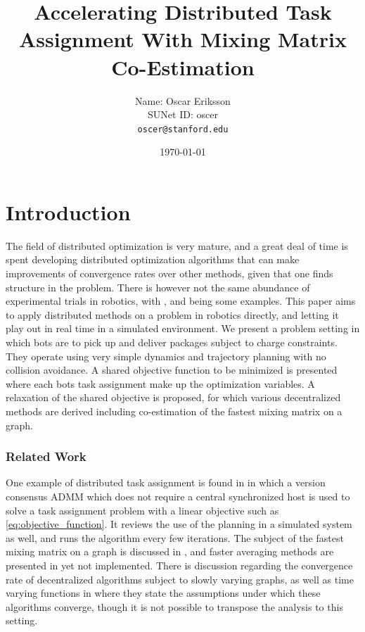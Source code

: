 \documentclass{article}
\title{{\large \bf Accelerating Distributed Task Assignment With Mixing Matrix Co-Estimation}}
\author{Name: Oscar Eriksson \\ SUNet ID: oscer \\ \texttt{oscer@stanford.edu}}
\date{\monthyeardate\today}
\newcommand{\sectiontype}{}
\begin{document}
\maketitle
\section*{Introduction}
\renewcommand{\sectiontype}{Introduction}
The field of distributed optimization is very mature, and a great deal of time is spent developing distributed optimization algorithms that can make improvements of convergence rates over other methods, given that one finds structure in the problem. 
There is however not the same abundance of experimental trials in robotics, with \cite{haksar2022consensus}, \cite{shorinwa2020distributed} and \cite{jadbabaie2003coordination} being some examples. This paper aims to apply distributed methods on a problem in robotics directly, and letting it play out in real time in a simulated environment. We present a problem setting in which bots are to pick up and deliver packages subject to charge constraints. They operate using very simple dynamics and trajectory planning with no collision avoidance. A shared objective function to be minimized is presented where each bots task assignment make up the optimization variables. A relaxation of the shared objective is proposed, for which various decentralized methods are derived including co-estimation of the fastest mixing matrix on a graph.

\subsubsection*{Related Work}
One example of distributed task assignment is found in \cite{shorinwa2023distributed} in which a version consensus ADMM which does not require a central synchronized host is used to solve a task assignment problem with a linear objective such as \eqref{eq:objective_function}. It reviews the use of the planning in a simulated system as well, and runs the algorithm every few iterations.
The subject of the fastest mixing matrix on a graph is discussed in \cite{xiao2004fast}, and faster averaging methods are presented in \cite{johansson2008faster} yet not implemented. There is discussion regarding the convergence rate of decentralized algorithms subject to slowly varying graphs, as well as time varying functions in \cite{rogozin2019optimal} where they state the assumptions under which these algorithms converge, though it is not possible to transpose the analysis to this setting.
\end{document}
